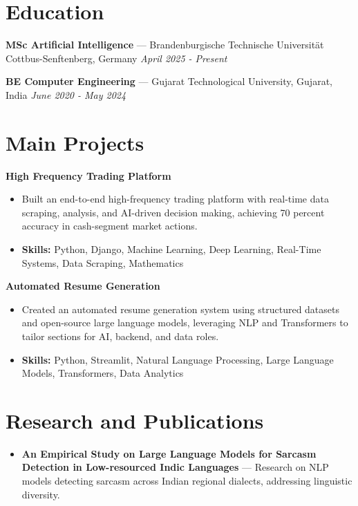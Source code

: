 \documentclass[a4paper,10pt]{article}
\begin{document}
\section*{Education}
\textbf{MSc Artificial Intelligence} — Brandenburgische Technische Universität Cottbus-Senftenberg, Germany \hfill \textit{April 2025 - Present}\par
\vspace{1.5pt}
\textbf{BE Computer Engineering} — Gujarat Technological University, Gujarat, India \hfill \textit{June 2020 - May 2024}\par

\section*{Main Projects}
\textbf{High Frequency Trading Platform}\par
\vspace{1pt}
\begin{itemize}
  \item Built an end-to-end high-frequency trading platform with real-time data scraping, analysis, and AI-driven decision making, achieving 70 percent accuracy in cash-segment market actions.
  \item \textbf{Skills:} Python, Django, Machine Learning, Deep Learning, Real-Time Systems, Data Scraping, Mathematics
\end{itemize}
\vspace{3pt}
\textbf{Automated Resume Generation}\par
\vspace{1pt}
\begin{itemize}
  \item Created an automated resume generation system using structured datasets and open-source large language models, leveraging NLP and Transformers to tailor sections for AI, backend, and data roles.
  \item \textbf{Skills:} Python, Streamlit, Natural Language Processing, Large Language Models, Transformers, Data Analytics
\end{itemize}

\section*{Research and Publications}
\begin{itemize}
\item \textbf{An Empirical Study on Large Language Models for Sarcasm Detection in Low-resourced Indic Languages} — Research on NLP models detecting sarcasm across Indian regional dialects, addressing linguistic diversity.
\end{itemize}
\end{document}
